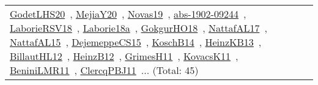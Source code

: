 {\begin{longtable}{lp{3cm}>{\raggedright\arraybackslash}p{6cm}>{\raggedright\arraybackslash}p{6cm}>{\raggedright\arraybackslash}p{8cm}}
\href{works/GodetLHS20.pdf}{GodetLHS20}~\cite{GodetLHS20}, \href{works/MejiaY20.pdf}{MejiaY20}~\cite{MejiaY20}, \href{works/Novas19.pdf}{Novas19}~\cite{Novas19}, \href{works/abs-1902-09244.pdf}{abs-1902-09244}~\cite{abs-1902-09244}, \href{works/LaborieRSV18.pdf}{LaborieRSV18}~\cite{LaborieRSV18}, \href{works/Laborie18a.pdf}{Laborie18a}~\cite{Laborie18a}, \href{works/GokgurHO18.pdf}{GokgurHO18}~\cite{GokgurHO18}, \href{works/NattafAL17.pdf}{NattafAL17}~\cite{NattafAL17}, \href{works/NattafAL15.pdf}{NattafAL15}~\cite{NattafAL15}, \href{works/DejemeppeCS15.pdf}{DejemeppeCS15}~\cite{DejemeppeCS15}, \href{works/KoschB14.pdf}{KoschB14}~\cite{KoschB14}, \href{works/HeinzKB13.pdf}{HeinzKB13}~\cite{HeinzKB13}, \href{works/BillautHL12.pdf}{BillautHL12}~\cite{BillautHL12}, \href{works/HeinzB12.pdf}{HeinzB12}~\cite{HeinzB12}, \href{works/GrimesH11.pdf}{GrimesH11}~\cite{GrimesH11}, \href{works/KovacsK11.pdf}{KovacsK11}~\cite{KovacsK11}, \href{works/BeniniLMR11.pdf}{BeniniLMR11}~\cite{BeniniLMR11}, \href{works/ClercqPBJ11.pdf}{ClercqPBJ11}~\cite{ClercqPBJ11}... (Total: 45)\\

\end{longtable}}
